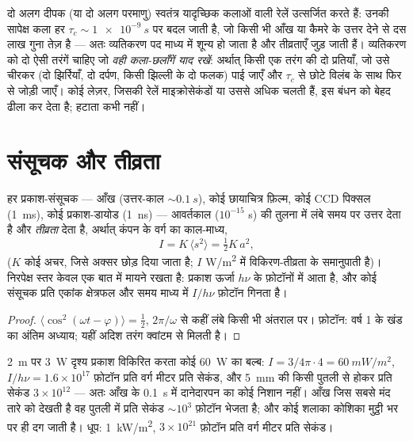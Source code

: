\begin{remark}[दो स्रोत, एक स्रोत]\label{rem:b2:scalar-light-model:twosources}
दो अलग दीपक (या दो अलग परमाणु) स्वतंत्र यादृच्छिक कलाओं वाली रेलें
उत्सर्जित करते हैं: उनकी सापेक्ष कला हर $\tau_c
\sim \qty{1e-9}{s}$ पर बदल जाती है, जो किसी भी आँख या कैमरे के उत्तर देने से
दस लाख गुना तेज़ है --- अतः व्यतिकरण पद माध्य में शून्य हो जाता है और
तीव्रताएँ जुड़ जाती हैं। व्यतिकरण को दो ऐसी तरंगें चाहिए जो \emph{वही
कला-छलाँगें याद रखें}: अर्थात् किसी एक तरंग की दो प्रतियाँ, जो उसे चीरकर
(दो झिर्रियाँ, दो दर्पण, किसी झिल्ली के दो फलक) पाई जाएँ और $\tau_c$ से छोटे
विलंब के साथ फिर से जोड़ी जाएँ। कोई लेज़र, जिसकी रेलें माइक्रोसेकंडों या
उससे अधिक चलती हैं, इस बंधन को बेहद ढीला कर देता है; हटाता कभी नहीं।
\end{remark}

\section{संसूचक और तीव्रता}

\begin{proposition}[कोई संसूचक क्या नापता है]\label{prop:b2:scalar-light-model:intensity}
हर प्रकाश-संसूचक --- आँख (उत्तर-काल $\sim\qty{0.1}{s}$), कोई
छायाचित्र फ़िल्म, कोई CCD पिक्सल (\qty{1}{ms}), कोई प्रकाश-डायोड (\qty{1}{ns}) ---
आवर्तकाल ($10^{-15}$ s) की तुलना में लंबे समय पर उत्तर देता है और
\emph{तीव्रता} देता है, अर्थात् कंपन के वर्ग का
काल-माध्य,
\[
I = K\,\langle s^2\rangle = \tfrac12K\,a^2 ,
\]
($K$ कोई अचर, जिसे अक्सर छोड़ दिया जाता है; $I$ \unit{W/m^2} में विकिरण-तीव्रता
के समानुपाती है)। निरपेक्ष स्तर केवल एक बात में मायने रखता है: प्रकाश
ऊर्जा $h\nu$ के फ़ोटॉनों में आता है, और कोई संसूचक प्रति एकांक क्षेत्रफल और
समय माध्य में $I/h\nu$ फ़ोटॉन गिनता है।
\end{proposition}

\begin{proof}
$\langle\cos^2(\omega t - \varphi)\rangle = \tfrac12$, $2\pi/\omega$ से कहीं लंबे किसी भी
अंतराल पर। फ़ोटॉन: वर्ष 1 के खंड का अंतिम अध्याय; यहीं
अदिश तरंग क्वांटम से मिलती है।
\end{proof}

\begin{example}[कोटियाँ]\label{ex:b2:scalar-light-model:orders}
\qty{2}{m} पर \qty{3}{W} दृश्य प्रकाश विकिरित करता कोई \qty{60}{W} का बल्ब:
$I = 3/4\pi\cdot4 = \qty{60}{mW/m^2}$, $I/h\nu = 1.6 \times 10^{17}$ फ़ोटॉन प्रति वर्ग
मीटर प्रति सेकंड, और \qty{5}{mm} की किसी पुतली से होकर प्रति सेकंड $3 \times 10^{12}$ ---
अतः आँख के \qty{0.1}{s} में दानेदारपन का कोई निशान नहीं। आँख जिस
सबसे मंद तारे को देखती है वह पुतली में प्रति सेकंड $\sim 10^3$ फ़ोटॉन भेजता है;
और कोई शलाका कोशिका मुट्ठी भर पर ही दग जाती है। धूप: \qty{1}{kW/m^2}, $3 \times 10^{21}$
फ़ोटॉन प्रति वर्ग मीटर प्रति सेकंड।
\end{example}

